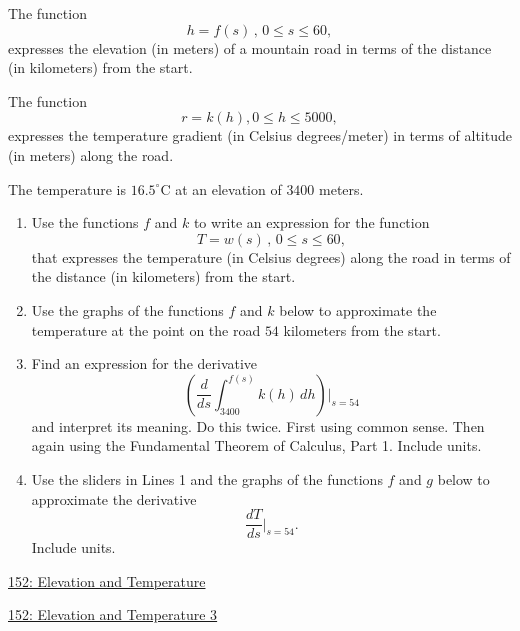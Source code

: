 \documentclass{ximera}
\begin{document}
\begin{question}  \label{Q9erKKe33399}
The function
\[
   h = f(s) \, , \, 0\leq s \leq 60 ,
\]
expresses the elevation (in meters) of a mountain road in terms of the distance (in kilometers) from the start.

The function 
\[
    r = k(h) , 0\leq h \leq 5000 ,
\] 
expresses the temperature gradient (in Celsius degrees/meter) in terms of altitude (in meters) along the road.

The temperature is $16.5^\circ$C  at an elevation of $3400$ meters.

\begin{enumerate}
\item Use the functions $f$ and $k$ to write an expression for the function
\[
 T = w(s) \, , \, 0\leq s \leq 60 ,
\]
that expresses the temperature (in Celsius degrees) along the road in terms of the distance (in kilometers) from the start.

\item Use the graphs of the functions $f$ and $k$ below to approximate the temperature at the point on the road $54$ kilometers from the start.

\item Find an expression for the derivative
\[
    \left(  \frac{d}{ds} \int_{3400}^{f(s)} k(h)\, dh       \right)\Big| _{s=54}
\]
and interpret its meaning. Do this twice. First using common sense. Then again using the Fundamental Theorem of Calculus, Part 1. Include units.


\item Use the sliders in Lines 1 and the graphs of the functions $f$ and $g$ below to approximate the derivative
\[
   \frac{dT}{ds}\Big|_{s=54} .
\]
Include units.

\end{enumerate}

\begin{onlineOnly}
    \begin{center}
\end{center}
\end{onlineOnly}

\href{https://www.desmos.com/calculator/gcmfa2a6jz}{152: Elevation and Temperature}

\begin{onlineOnly}
    \begin{center}
\end{center}
\end{onlineOnly}

\href{https://www.desmos.com/calculator/vvr0qrgoh1}{152: Elevation and Temperature 3}
\end{question}
\end{document}
